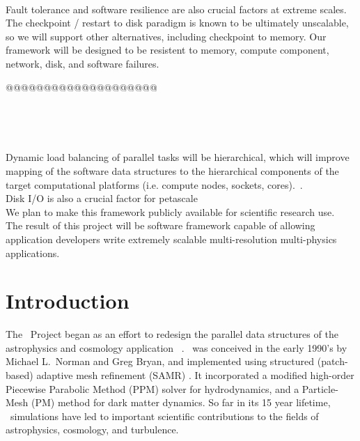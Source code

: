 \documentclass{article}
\begin{document}
\ \\  Fault tolerance and software
resilience are also crucial factors at extreme scales.  The checkpoint
/ restart to disk paradigm is known to be ultimately unscalable, so we
will support other alternatives, including checkpoint to memory.
Our framework will be designed to be resistent to memory, compute
component, network, disk, and software failures.

@@@@@@@@@@@@@@@@@@@@

\ \\ 


\ \\ 
%

%
Dynamic load balancing of parallel tasks will be hierarchical, which
will improve mapping of the software data structures to the
hierarchical components of the target computational platforms (i.e.
compute nodes, sockets, cores).~\cite{@@@LAN-DLB}.
%
%
%
\ \\ 
Disk I/O is also a crucial factor for petascale 
%
\ \\  We plan to make this framework publicly
available for scientific research use.
%
\ \\  
The result of this project will be software framework capable of
allowing application developers write extremely scalable
multi-resolution multi-physics applications.

\section{Introduction} \label{s:intro}


The \cello\ Project began as an effort to redesign the parallel data
structures of the astrophysics and cosmology application \enzo\
\cite{@@@ENZO}.  \enzo\ was conceived in the early 1990's by Michael
L.~Norman and Greg Bryan, and implemented using structured
(patch-based) adaptive mesh refinement (SAMR) \cite{@@@SAMR}.  It
incorporated a modified high-order Piecewise Parabolic Method (PPM)
solver \cite{@@@PPM} for hydrodynamics, and a Particle-Mesh (PM)
method \cite{@@@PM} for dark matter dynamics.  So far in its 15 year
lifetime, \enzo\ simulations have led to important scientific
contributions to the fields of astrophysics, cosmology, and
turbulence.
\end{document}
